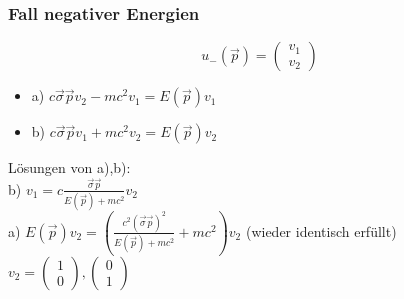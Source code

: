 \documentclass[twoside,a4paper]{scrartcl}
\renewcommand{\1}{\mathds{1}}
\begin{document}
\subsubsection*{Fall negativer Energien}
$$u_-(\vec p)=\begin{pmatrix}v_1 \\ v_2\end{pmatrix}$$
\begin{itemize}
\item a) $c\vec \sigma \vec p v_2-mc^2 v_1=E(\vec p)v_1$
\item b) $c\vec \sigma \vec p v_1+mc^2 v_2=E(\vec p)v_2$
\end{itemize}
Lösungen von a),b):\\
b) $v_1=c\frac{\vec \sigma \vec p}{E(\vec p)+mc^2}v_2$\\
a) $E(\vec p)v_2=(\frac{c^2(\vec\sigma\vec p)^2}{E(\vec p)+mc^2}+mc^2)v_2$ (wieder identisch erfüllt)\\
$v_2=\begin{pmatrix}1 \\ 0\end{pmatrix},\begin{pmatrix}0 \\ 1\end{pmatrix}$
\end{document}
